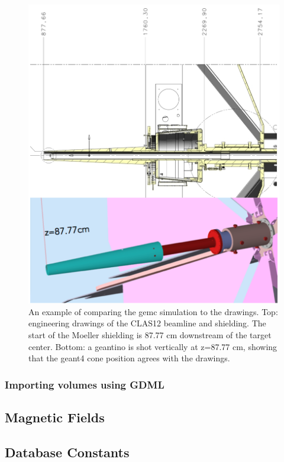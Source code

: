 \begin{figure}
	\centering
	\includegraphics[width=0.95\columnwidth,keepaspectratio]{img/cadValidationExample.png}
	\caption{An example of comparing the gemc simulation to the drawings. Top: engineering drawings of
             the CLAS12 beamline and shielding. The start of the Moeller shielding is 87.77 cm downstream
             of the target center. Bottom: a geantino is shot vertically at z=87.77 cm, showing that the
             geant4 cone position agrees with the drawings.}
	\label{fig:cadValidationExample}
\end{figure}

\subsubsection{Importing volumes using GDML}


\subsection{Magnetic Fields}

\subsection{Database Constants}

